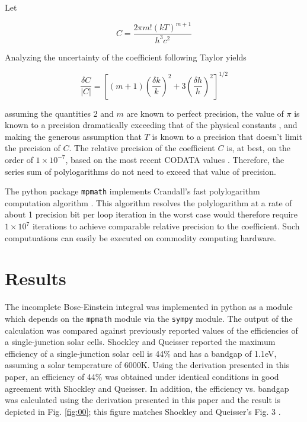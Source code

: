 \documentclass[letterpaper,12pt]{article}
\begin{document}
Let

\begin{equation} \label{eq:52}
C = \frac{2 \pi m! (kT)^{m+1}}{h^{3}c^{2}}
\end{equation}

\noindent Analyzing the uncertainty of the coefficient following Taylor \cite{9780935702422} yields

\begin{equation} \label{eq:53}
\frac{\delta C}{|C|} = \left[ (m+1) \left( \frac{\delta k}{k} \right)^{2} + 3 \left( \frac{\delta h}{h} \right)^{2} \right]^{1/2}
\end{equation}

\noindent assuming the quantities 2 and $m$ are known to perfect precision, the value of $\pi$ is known to a precision dramatically exceeding that of the physical constants \cite{http://www.numberworld.org/misc_runs/pi-12t}, and making the generous assumption that $T$ is known to a precision that doesn't limit the precision of $C$. The relative precision of the coefficient $C$ is, at best, on the order of $1 \times 10^{-7}$, based on the most recent CODATA values \cite{10.1103/RevModPhys.84.1527}. Therefore, the series sum of polylogarithms do not need to exceed that value of precision.

The python package \texttt{mpmath} \cite{mpmath} implements Crandall's fast polylogarithm computation algorithm \cite{http://academic.reed.edu/physics/faculty/crandall/papers/Polylog}. This algorithm resolves the polylogarithm at a rate of about 1 precision bit per loop iteration in the worst case would therefore require $1 \times 10^{7}$ iterations to achieve comparable relative precision to the coefficient. Such computuations can easily be executed on commodity computing hardware.


\section{Results}
The incomplete Bose-Einstein integral was implemented in python as a module \cite{10.6084/m9.figshare.1229713} which depends on the \texttt{mpmath} module via the \texttt{sympy} module. The output of the calculation was compared against previously reported values of the efficiencies of a single-junction solar cells. Shockley and Queisser \cite{10.1063/1.1736034} reported the maximum efficiency of a single-junction solar cell is 44\% and has a bandgap of 1.1eV, assuming a solar temperature of 6000K. Using the derivation presented in this paper, an efficiency of 44\% was obtained under identical conditions in good agreement with Shockley and Queisser. In addition, the efficiency vs. bandgap was calculated using the derivation presented in this paper and the result is depicted in Fig. \ref{fig:00}; this figure matches Shockley and Queisser's Fig. 3 \cite{10.1063/1.1736034}.
\end{document}
